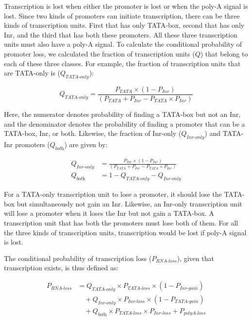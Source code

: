 \documentclass[12pt,a4paper]{article}
\begin{document}
Transcription is lost when either the promoter is lost or when the poly-A signal is lost. Since two kinds of promoters can initiate transcription, there can be three kinds of transcription units. First that has only TATA-box, second that has only Inr, and the third that has both these promoters. All these three transcription units must also have a poly-A signal. To calculate the conditional probability of promoter loss, we calculated the fraction of transcription units ($Q$) that belong to each of these three classes. For example, the fraction of transcription units that are TATA-only is ($Q_\textit{TATA-only}$):

\begin{equation*}
Q_\textit{TATA-only} = \frac{P_\textit{TATA}\times(1 - P_\textit{Inr})}{(P_\textit{TATA} + P_\textit{Inr} - P_\textit{TATA}\times P_\textit{Inr})}
\end{equation*}

\vspace{1ex}

Here, the numerator denotes probability of finding a TATA-box but not an Inr, and the denominator denotes the probability of finding a promoter that can be a TATA-box, Inr, or both. Likewise, the fraction of Inr-only ($Q_\textit{Inr-only}$) and TATA-Inr promoters ($Q_\textit{both}$) are given by:

\begin{align*}
Q_\textit{Inr-only} & = \frac{P_\textit{Inr}\times(1 - P_\textit{Inr})}{(P_\textit{TATA} + P_\textit{Inr} - P_\textit{TATA}\times P_\textit{Inr})} \\[1ex]
Q_\textit{both} & = 1 - Q_\textit{TATA-only} -Q_\textit{Inr-only}
\end{align*}

For a TATA-only transcription unit to lose a promoter, it should lose the TATA-box but simultaneously not gain an Inr. Likewise, an Inr-only transcription unit will lose a promoter when it loses the Inr but not gain a TATA-box. A transcription unit that has both the promoters must lose both of them. For all the three kinds of transcription units, transcription would be lost if poly-A signal is lost.

The conditional probability of transcription loss ($P_\textit{RNA-loss}$), given that transcription exists, is thus defined as:

\begin{align}
P_\textit{RNA-loss} & = Q_\textit{TATA-only} \times P_\textit{TATA-loss}\times(1-P_\textit{Inr-gain}) \nonumber\\[1pt]
 & \quad + Q_\textit{Inr-only}\times P_\textit{Inr-loss}\times(1-P_\textit{TATA-gain}) \nonumber \\[1pt]
 & \quad + Q_\textit{both}\times P_\textit{TATA-loss} \times P_\textit{Inr-loss} + P_\textit{polyA-loss}
\label{eqrnaloss}
\end{align}
\end{document}

